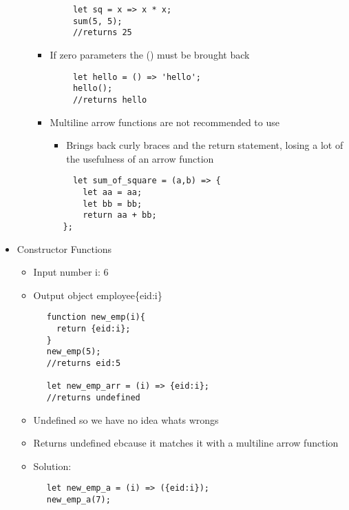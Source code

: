 \documentclass{article}
\begin{document}
\begin{itemize}
\begin{itemize}
\begin{itemize}
      \end{itemize}
      \begin{lstlisting}
        let sq = x => x * x;
        sum(5, 5);
        //returns 25
      \end{lstlisting}
      \begin{itemize}
        \item If zero parameters the () must be brought back
      \end{itemize}
      \begin{lstlisting}
        let hello = () => 'hello';
        hello();
        //returns hello
      \end{lstlisting}
      \begin{itemize}
        \item Multiline arrow functions are not recommended to use
        \begin{itemize}
          \item Brings back curly braces and the return statement, losing a lot of the usefulness of an arrow function
        \end{itemize}
      \end{itemize}
      \begin{lstlisting}
        let sum_of_square = (a,b) => {
          let aa = aa;
          let bb = bb;
          return aa + bb;
      };
      \end{lstlisting}
    \end{itemize}

    \item Constructor Functions
    \begin{itemize}
      \item Input number i: 6
      \item Output object employee\{eid:i\}
    \end{itemize}
    \begin{lstlisting}
      function new_emp(i){
        return {eid:i};
      }
      new_emp(5);
      //returns eid:5

      let new_emp_arr = (i) => {eid:i};
      //returns undefined
    \end{lstlisting}
    \begin{itemize}
      \item Undefined so we have no idea whats wrongs
      \item Returns undefined ebcause it matches it with a multiline arrow function
      \item Solution:
    \end{itemize}
    \begin{lstlisting}
      let new_emp_a = (i) => ({eid:i});
      new_emp_a(7);
    \end{lstlisting}
\end{itemize}
\end{document}

